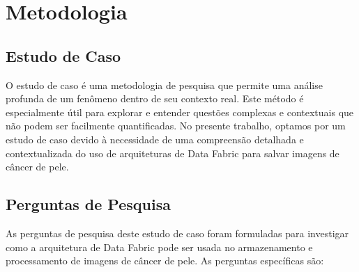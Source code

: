 \chapter[Metodologia]{Metodologia}

\section{Estudo de Caso}

O estudo de caso é uma metodologia de pesquisa que permite uma análise profunda de um fenômeno dentro de seu contexto real. Este método é especialmente útil para explorar e entender questões complexas e contextuais que não podem ser facilmente quantificadas. No presente trabalho, optamos por um estudo de caso devido à necessidade de uma compreensão detalhada e contextualizada do uso de arquiteturas de Data Fabric para salvar imagens de câncer de pele.

\section{Perguntas de Pesquisa}

As perguntas de pesquisa deste estudo de caso foram formuladas para investigar como a arquitetura de Data Fabric pode ser usada no armazenamento e processamento de imagens de câncer de pele. As perguntas específicas são:

